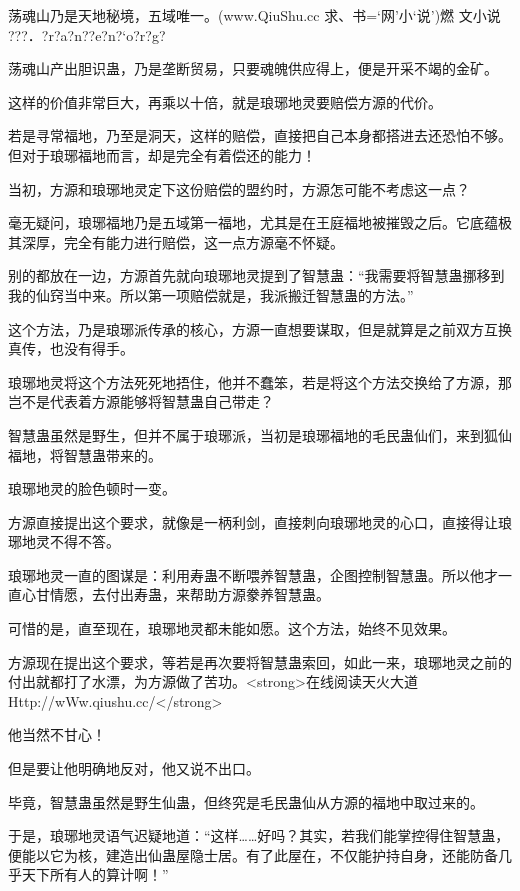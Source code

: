 
\begin{this_body}

荡魂山乃是天地秘境，五域唯一。(www.QiuShu.cc 求、书=‘网’小‘说’)燃 文小说   ???．?r?a?n??e?n?`o?r?g?

荡魂山产出胆识蛊，乃是垄断贸易，只要魂魄供应得上，便是开采不竭的金矿。

这样的价值非常巨大，再乘以十倍，就是琅琊地灵要赔偿方源的代价。

若是寻常福地，乃至是洞天，这样的赔偿，直接把自己本身都搭进去还恐怕不够。但对于琅琊福地而言，却是完全有着偿还的能力！

当初，方源和琅琊地灵定下这份赔偿的盟约时，方源怎可能不考虑这一点？

毫无疑问，琅琊福地乃是五域第一福地，尤其是在王庭福地被摧毁之后。它底蕴极其深厚，完全有能力进行赔偿，这一点方源毫不怀疑。

别的都放在一边，方源首先就向琅琊地灵提到了智慧蛊：“我需要将智慧蛊挪移到我的仙窍当中来。所以第一项赔偿就是，我派搬迁智慧蛊的方法。”

这个方法，乃是琅琊派传承的核心，方源一直想要谋取，但是就算是之前双方互换真传，也没有得手。

琅琊地灵将这个方法死死地捂住，他并不蠢笨，若是将这个方法交换给了方源，那岂不是代表着方源能够将智慧蛊自己带走？

智慧蛊虽然是野生，但并不属于琅琊派，当初是琅琊福地的毛民蛊仙们，来到狐仙福地，将智慧蛊带来的。

琅琊地灵的脸色顿时一变。

方源直接提出这个要求，就像是一柄利剑，直接刺向琅琊地灵的心口，直接得让琅琊地灵不得不答。

琅琊地灵一直的图谋是：利用寿蛊不断喂养智慧蛊，企图控制智慧蛊。所以他才一直心甘情愿，去付出寿蛊，来帮助方源豢养智慧蛊。

可惜的是，直至现在，琅琊地灵都未能如愿。这个方法，始终不见效果。

方源现在提出这个要求，等若是再次要将智慧蛊索回，如此一来，琅琊地灵之前的付出就都打了水漂，为方源做了苦功。<strong>在线阅读天火大道Http://wWw.qiushu.cc/</strong>

他当然不甘心！

但是要让他明确地反对，他又说不出口。

毕竟，智慧蛊虽然是野生仙蛊，但终究是毛民蛊仙从方源的福地中取过来的。

于是，琅琊地灵语气迟疑地道：“这样……好吗？其实，若我们能掌控得住智慧蛊，便能以它为核，建造出仙蛊屋隐士居。有了此屋在，不仅能护持自身，还能防备几乎天下所有人的算计啊！”


\end{this_body}
